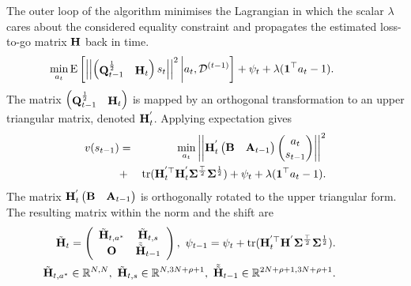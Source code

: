 The outer loop of the algorithm minimises the Lagrangian in which the scalar $\lambda$ cares about the considered equality constraint and propagates the estimated loss-to-go matrix $\mathbf{H}$ back in time.
\begin{eqnarray}
 \nonumber
    &&\hspace*{-8ex}\min_{a_{t}}\text{E}\left[\left|\left|\begin{pmatrix}\sqmat{Q}_{t-1} &\mat{H}_{t}\end{pmatrix}
    s_{t}\right|\right|^2\bigg| a_{t}, \mathcal{D}^{(t-1)}\right] + \psi_{t} + \lambda(\mat{1}^{\top}a_{t} -1).
 \end{eqnarray}
The matrix $\begin{pmatrix}\mathbf{Q}^{\frac{1}{2}}_{t-1} &\mathbf{H}_{t}\end{pmatrix}$
    is mapped by an orthogonal transformation to an upper triangular matrix, denoted $\mathbf{H}^{'}_{t}$. Applying expectation gives
\begin{eqnarray}
\nonumber
v(s_{t-1})& =&\min_{a_{t}} \left|\left|\mathbf{H}^{'}_{t}\begin{pmatrix}\mathbf{B} & \mathbf{A}_{t-1}\end{pmatrix}
\begin{pmatrix}a_{t}\\
s_{t-1} \end{pmatrix}\right|\right|^2 \\
\nonumber
&+& \text{tr}(\mathbf{H}^{'\top}_{t} \mathbf{H}^{'}_{t}\mathbf{\Sigma}^{\frac{\top}{2}}\mathbf{\Sigma}^{\frac{1}{2}}) + \psi_{t} + \lambda(\mathbf{1}^{\top}a_{t} -1).
\end{eqnarray}
The matrix $\mathbf{H}^{'}_{t}\begin{pmatrix}\mathbf{B} & \mathbf{A}_{t-1}\end{pmatrix}$ is orthogonally rotated to the upper triangular form.  The resulting matrix within the norm and the shift are
\begin{eqnarray*}
&&\hspace*{-9ex}\tildemat{H}_{t}=\left(\begin{array}{cc}
    \tildemat{H}_{t, a^{\ast}} & \tildemat{H}_{t, s} \\
    \mat{O} & \tilde{\tildemat{H}}_{t-1}
\end{array}\right),\ \psi_{t-1} = \psi_{t} + \text{tr}(\mat{H}^{'\top}_{t}\mat{H}^{'}\mat{\Sigma}^{\frac{\top}{2}}\mat{\Sigma}^{\frac{1}{2}}).\\
&&\hspace*{-9ex}\tildemat{H}_{t, a^{\ast}}\in\mathbb{R}^{N,N},\ \tildemat{H}_{t, s}\in \mathbb{R}^{N, 3N+\rho+1},\ \tilde{\tildemat{H}}_{t-1}\in \mathbb{R}^{2N+\rho+1, 3N+\rho+1}.
\end{eqnarray*}
